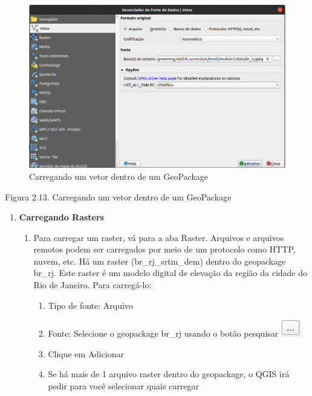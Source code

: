\documentclass[
]{book}
\providecommand{\tightlist}{%
  \setlength{\itemsep}{0pt}\setlength{\parskip}{0pt}}
\begin{document}
\begin{figure}
\centering
\includegraphics{media/modulo2/data-source-manager-vector.png}
\caption{Carregando um vetor dentro de um GeoPackage}
\end{figure}

Figura 2.13. Carregando um vetor dentro de um GeoPackage

\begin{enumerate}
\def\labelenumi{\arabic{enumi}.}
\setcounter{enumi}{2}
\item
  \textbf{Carregando Rasters}

  \begin{enumerate}
  \def\labelenumii{\arabic{enumii}.}
  \item
    Para carregar um raster, vá para a aba Raster. Arquivos e arquivos remotos podem ser carregados por meio de um protocolo como HTTP, nuvem, etc. Há um raster (br\_rj\_srtm\_dem) dentro do geopackage br\_rj. Este raster é um modelo digital de elevação da região da cidade do Rio de Janeiro. Para carregá-lo:

    \begin{enumerate}
    \def\labelenumiii{\arabic{enumiii}.}
    \tightlist
    \item
      Tipo de fonte: Arquivo
    \item
      Fonte: Selecione o geopackage br\_rj usando o botão pesquisar \includegraphics{media/modulo2/data-source-manager-search.png}
    \item
      Clique em Adicionar
    \item
      Se há mais de 1 arquivo raster dentro do geopackage, o QGIS irá pedir para você selecionar quais carregar
    \end{enumerate}
  \end{enumerate}
\end{enumerate}
\end{document}
